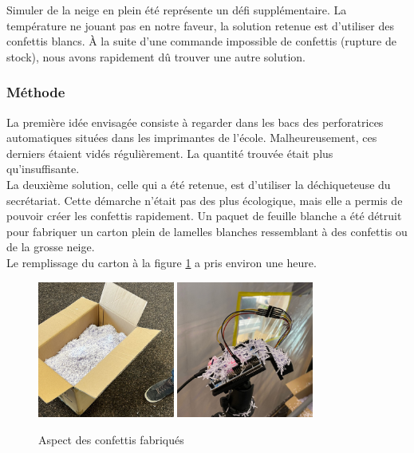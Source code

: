 Simuler de la neige en plein été représente un défi supplémentaire. La température ne jouant pas en notre 
faveur, la solution retenue est d’utiliser des confettis blancs. À la suite d’une commande impossible 
de confettis (rupture de stock), nous avons rapidement dû trouver une autre solution.

\subsubsection{Méthode}

La première idée envisagée consiste à regarder dans les bacs des perforatrices automatiques situées 
dans les imprimantes de l’école. Malheureusement, ces derniers étaient vidés régulièrement. La quantité 
trouvée était plus qu’insuffisante.\\
La deuxième solution, celle qui a été retenue, est d’utiliser la déchiqueteuse du secrétariat. Cette 
démarche n’était pas des plus écologique, mais elle a permis de pouvoir créer les confettis rapidement. 
Un paquet de feuille blanche a été détruit pour fabriquer un carton plein de lamelles blanches ressemblant 
à des confettis ou de la grosse neige. \\
Le remplissage du carton à la figure \ref{fig:confettis} a pris environ une heure. 

\begin{figure}[H]
    \centering
    \includegraphics[width=0.4\textwidth]{Images/photos_PGA/ConfBox.jpeg}
    \includegraphics[width=0.4\textwidth]{Images/photos_PGA/conf.jpeg}
    \caption{Aspect des confettis fabriqués}
    \label{fig:confettis}
\end{figure}

